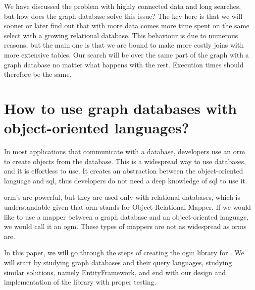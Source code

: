\begin{introduction}
    We have discussed the problem with highly connected data and long searches, but how does the graph database solve this issue?
    The key here is that we will sooner or later find out that with more data comes more time spent on the same select with a growing relational database.
    This behaviour is due to numerous reasons, but the main one is that we are bound to make more costly joins with more extensive tables.
    Our search will be over the same part of the graph with a graph database no matter what happens with the rest. Execution times should therefore be the same.

    \section{How to use graph databases with object-oriented languages?}

    In most applications that communicate with a database, developers use an \acrshort{orm} to create objects from the database.
    This is a widespread way to use databases, and it is effortless to use. It creates an abstraction between the object-oriented language and \acrshort{sql}, thus developers do not need a deep knowledge of \acrshort{sql} to use it.

    \acrshort{orm}'s are powerful, but they are used only with relational databases, which is understandable given that \acrshort{orm} stands for Object-Relational Mapper.
    If we would like to use a mapper between a graph database and an object-oriented language, we would call it an \acrfull{ogm}. These types of mappers are not as widespread as \acrshort{orm}s are.

    In this paper, we will go through the steps of creating the \acrshort{ogm} library for \CS.
    We will start by studying graph databases and their query languages, studying similar solutions, namely EntityFramework, and end with our design and implementation of the library with proper testing.

\end{introduction}
